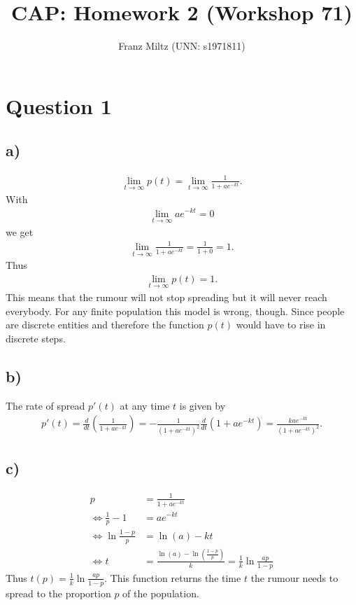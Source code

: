 \documentclass{article}
\title{CAP: Homework 2 (Workshop 71)}
\author{Franz Miltz (UNN: s1971811)}
\begin{document}
\maketitle
\section*{Question 1}
\subsection*{a)}
\begin{align*}
  \lim_{t\to\infty} p(t) = \lim_{t\to\infty} \frac{1}{1+ae^{-kt}}.
\end{align*}
With
\begin{align*}
  \lim_{t\to\infty} ae^{-kt} = 0
\end{align*}
we get
\begin{align*}
  \lim_{t\to\infty}\frac{1}{1+ae^{-kt}}=\frac{1}{1+0}=1.
\end{align*}
Thus
\begin{align*}
  \lim_{t\to\infty}p(t)=1.
\end{align*}
This means that the rumour will not stop spreading but it will never reach everybody.
For any finite population this model is wrong, though.
Since people are discrete entities and therefore the function $p(t)$ would have to rise in discrete steps.
\subsection*{b)}
The rate of spread $p'(t)$ at any time $t$ is given by
\begin{align*}
  p'(t)=\frac{d}{dt}\left(\frac{1}{1+ae^{-kt}}\right)=-\frac{1}{(1+ae^{-kt})^2}\frac{d}{dt}(1+ae^{-kt})
  =\frac{kae^{-kt}}{(1+ae^{-kt})^2}.
\end{align*}
\subsection*{c)}
\begin{align*}
  p                                 & =\frac{1}{1+ae^{-kt}}                                              \\
  \Leftrightarrow \frac{1}{p}-1     & =ae^{-kt}                                                          \\
  \Leftrightarrow \ln \frac{1-p}{p} & = \ln(a) -kt                                                       \\
  \Leftrightarrow t                 & = \frac{\ln(a)-\ln(\frac{1-p}{p})}{k}=\frac{1}{k}\ln\frac{ap}{1-p}
\end{align*}
Thus $t(p)=\frac{1}{k}\ln \frac{ap}{1-p}$. This function returns the time $t$ the rumour needs to spread to the proportion $p$ of the population.
\end{document}
